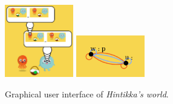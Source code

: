 \begin{figure}
	\begin{center}
		\includegraphics[width=3cm]{images/screenshot.png}
		\includegraphics[width=3cm]{images/hintikkas_world_epistemicmodel.png} 
	\end{center}
	\caption{Graphical user interface of \emph{Hintikka's world}.\label{figure:gui}}
\end{figure}
